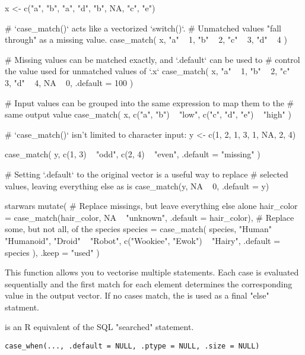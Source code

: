 \documentclass[a4paper]{book}
\begin{document}
\begin{Examples}
\begin{ExampleCode}
x <- c("a", "b", "a", "d", "b", NA, "c", "e")

# `case_match()` acts like a vectorized `switch()`.
# Unmatched values "fall through" as a missing value.
case_match(
  x,
  "a" ~ 1,
  "b" ~ 2,
  "c" ~ 3,
  "d" ~ 4
)

# Missing values can be matched exactly, and `.default` can be used to
# control the value used for unmatched values of `.x`
case_match(
  x,
  "a" ~ 1,
  "b" ~ 2,
  "c" ~ 3,
  "d" ~ 4,
  NA ~ 0,
  .default = 100
)

# Input values can be grouped into the same expression to map them to the
# same output value
case_match(
  x,
  c("a", "b") ~ "low",
  c("c", "d", "e") ~ "high"
)

# `case_match()` isn't limited to character input:
y <- c(1, 2, 1, 3, 1, NA, 2, 4)

case_match(
  y,
  c(1, 3) ~ "odd",
  c(2, 4) ~ "even",
  .default = "missing"
)

# Setting `.default` to the original vector is a useful way to replace
# selected values, leaving everything else as is
case_match(y, NA ~ 0, .default = y)

starwars %
  mutate(
    # Replace missings, but leave everything else alone
    hair_color = case_match(hair_color, NA ~ "unknown", .default = hair_color),
    # Replace some, but not all, of the species
    species = case_match(
      species,
      "Human" ~ "Humanoid",
      "Droid" ~ "Robot",
      c("Wookiee", "Ewok") ~ "Hairy",
      .default = species
    ),
    .keep = "used"
  )
\end{ExampleCode}
\end{Examples}
%
\begin{Description}
This function allows you to vectorise multiple  statements. Each
case is evaluated sequentially and the first match for each element
determines the corresponding value in the output vector. If no cases match,
the  is used as a final "else" statment.

 is an R equivalent of the SQL "searched"  statement.
\end{Description}
%
\begin{Usage}
\begin{verbatim}
case_when(..., .default = NULL, .ptype = NULL, .size = NULL)
\end{verbatim}
\end{Usage}
\end{document}
